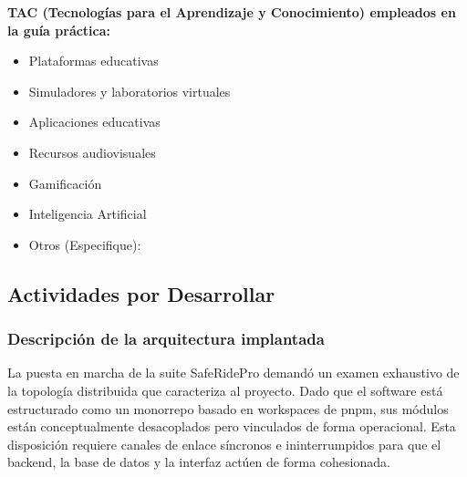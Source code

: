 \documentclass{article}
\newcommand{\checkedbox}{\stackinset{c}{0pt}{c}{0pt}{\checkmark}{$\square$}}
\begin{document}
\textbf{TAC (Tecnologías para el Aprendizaje y Conocimiento) empleados en la guía práctica:}
\begin{itemize}
    \item[\checkedbox] Plataformas educativas
    \item[$\square$] Simuladores y laboratorios virtuales
    \item[$\square$] Aplicaciones educativas
    \item[$\square$] Recursos audiovisuales
    \item[$\square$] Gamificación
    \item[\checkedbox] Inteligencia Artificial
    \item Otros (Especifique): \underline{\hspace{5cm}}
\end{itemize}

\subsection{Actividades por Desarrollar}
\subsubsection{Descripción de la arquitectura implantada}
La puesta en marcha de la suite SafeRidePro demandó un examen exhaustivo de la topología distribuida que caracteriza al proyecto. Dado que el software está estructurado como un monorrepo basado en workspaces de pnpm, sus módulos están conceptualmente desacoplados pero vinculados de forma operacional. Esta disposición requiere canales de enlace síncronos e ininterrumpidos para que el backend, la base de datos y la interfaz actúen de forma cohesionada.
\end{document}
